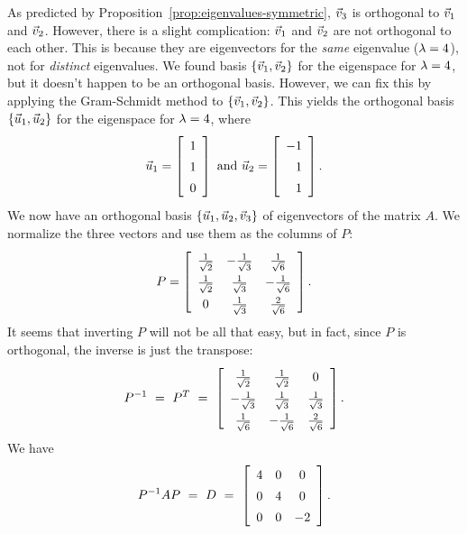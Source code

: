 \documentclass{ximera}
\begin{document}
\begin{solution}
  As predicted by Proposition~\ref{prop:eigenvalues-symmetric},
  $\vec{v}_3$ is orthogonal to $\vec{v}_1$ and
  $\vec{v}_2$. However, there is a slight complication: $\vec{v}_1$
  and $\vec{v}_2$ are not orthogonal to each other. This is because
  they are eigenvectors for the {\em same} eigenvalue ($\lambda=4$),
  not for {\em distinct} eigenvalues. We found basis
  $\left\{\vec{v}_1,\vec{v}_2\right\}$ for the eigenspace for $\lambda=4$,
  but it doesn't happen to be an orthogonal basis. However, we can fix
  this by applying the Gram-Schmidt method to
  $\left\{\vec{v}_1,\vec{v}_2\right\}$. This yields the orthogonal basis
  $\left\{\vec{u}_1,\vec{u}_2\right\}$ for the eigenspace for $\lambda=4$,
  where
  \begin{equation*}
    \vect{u}_1 = \startmat{r} 1 \\ 1 \\ 0 \stopmat
    \quad\mbox{and}\quad
    \vect{u}_2 = \startmat{r} -1 \\ 1 \\ 1 \stopmat.
\end{equation*}
We now have an orthogonal basis
$\left\{\vec{u}_1,\vec{u}_2,\vec{v}_3\right\}$ of eigenvectors of the
matrix $A$. We normalize the three vectors and use them as the
columns of $P$:
\begin{equation*}
    \def\arraystretch{1.4}
    P = \startmat{ccc}
      \frac{1}{\sqrt{2}} & -\frac{1}{\sqrt{3}} & \frac{1}{\sqrt{6}}  \\
      \frac{1}{\sqrt{2}} & \frac{1}{\sqrt{3}}  & -\frac{1}{\sqrt{6}} \\
      0                  & \frac{1}{\sqrt{3}}  & \frac{2}{\sqrt{6}}  \\
    \stopmat.
\end{equation*}
It seems that inverting $P$ will not be all that easy, but in fact,
since $P$ is orthogonal, the inverse is just the transpose:
\begin{equation*}
    \def\arraystretch{1.4}
    P^{-1}
    ~=~ P^T
    ~=~ \startmat{ccc}
      \frac{1}{\sqrt{2}}  & \frac{1}{\sqrt{2}}  & 0 \\
      -\frac{1}{\sqrt{3}} & \frac{1}{\sqrt{3}}  & \frac{1}{\sqrt{3}} \\
      \frac{1}{\sqrt{6}}  & -\frac{1}{\sqrt{6}} & \frac{2}{\sqrt{6}} \\
    \stopmat.
\end{equation*}
We have
\begin{equation*}
    P^{-1}AP
    ~=~ D
    ~=~ \startmat{ccc} 4 & 0 & 0 \\ 0 & 4 & 0 \\ 0 & 0 & -2 \stopmat.
\end{equation*}

\end{solution}
\end{document}
